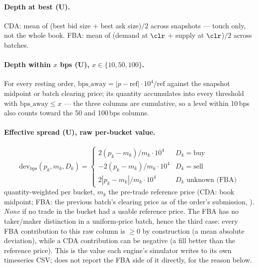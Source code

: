 \paragraph{Depth at best (U).} CDA: mean of (best bid size $+$ best ask
size)$/2$ across snapshots --- touch only, not the whole book. FBA: mean
of (demand at $\clr$ $+$ supply at $\clr$)$/2$ across batches.

\paragraph{Depth within $x$ bps (U), $x \in \{10, 50, 100\}$.} For every
resting order, $\mathrm{bps\_away} = |p - \mathrm{ref}| \cdot
10^{4}/\mathrm{ref}$ against the snapshot midpoint or batch clearing
price; its quantity accumulates into every threshold with
$\mathrm{bps\_away} \le x$ --- the three columns are cumulative, so a
level within 10\,bps also counts toward the 50 and 100\,bps columns.

\paragraph{Effective spread (U), raw per-bucket value.}
\begin{equation}
  \mathrm{dev}_{\mathrm{bps}}(p_k, m_k, D_k) =
  \begin{cases}
    2(p_k - m_k)/m_k \cdot 10^{4} & D_k = \text{buy}\\
    -2(p_k - m_k)/m_k \cdot 10^{4} & D_k = \text{sell}\\
    2|p_k - m_k|/m_k \cdot 10^{4} & D_k \text{ unknown (FBA)}
  \end{cases}
\end{equation}
quantity-weighted per bucket, $m_k$ the pre-trade reference price (CDA:
book midpoint; FBA: the previous batch's clearing price as of the order's
submission, ). \emph{None} if no
trade in the bucket had a usable reference price. The FBA has no
taker/maker distinction in a uniform-price batch, hence the third case:
every FBA contribution to this raw column is $\ge 0$ by construction (a
mean absolute deviation), while a CDA contribution can be negative (a
fill better than the reference price). This is the value each engine's
simulator writes to its own timeseries CSV;  does not
report the FBA side of it directly, for the reason below.

